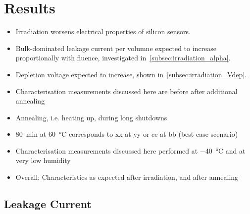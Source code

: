 \section{Results}
\label{sec:results}

\begin{itemize}
	\item Irradiation worsens electrical properties of silicon sensors.
	\item Bulk-dominated leakage current per volumne expected to increase proportionally with fluence, investigated in~\ref{subsec:irradiation_alpha}.
	\item Depletion voltage expected to increase, shown in~\ref{subsec:irradiation_Vdep}.		
	\item Characterisation measurements discussed here are before after additional annealing
	\item Annealing, i.e. heating up, during long shutdowns
	\item \SI{80}{\minute} at \SI{60}{\celsius} corresponds to xx at yy or cc at bb (best-case scenario)
	\item Characterisation measurements discussed here performed at \SI{-40}{\celsius} and at very low humidity
	\item Overall: Characteristics as expected after irradiation, and after annealing
\end{itemize}

\subsection{Leakage Current}
\label{subsec:leakagecurrents}

